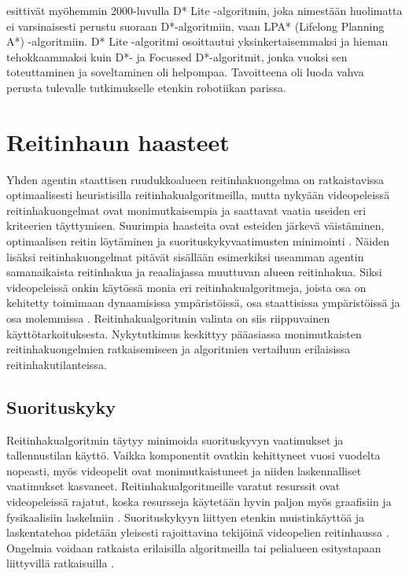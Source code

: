 \documentclass[utf8]{gradu3}
\begin{document}
\textcite{koenig2005fast} esittivät myöhemmin 2000-luvulla D* Lite -algoritmin, joka nimestään huolimatta ei varsinaisesti perustu suoraan D*-algoritmiin, vaan LPA* (Lifelong Planning A*) -algoritmiin. D* Lite -algoritmi osoittautui yksinkertaisemmaksi ja hieman tehokkaammaksi kuin D*- ja Focussed D*-algoritmit, jonka vuoksi sen toteuttaminen ja soveltaminen oli helpompaa. Tavoitteena oli luoda vahva perusta tulevalle tutkimukselle etenkin robotiikan parissa.

\section{Reitinhaun haasteet}

Yhden agentin staattisen ruudukkoalueen reitinhakuongelma on ratkaistavissa optimaalisesti heuristisilla reitinhakualgoritmeilla, mutta nykyään videopeleissä reitinhakuongelmat ovat monimutkaisempia ja saattavat vaatia useiden eri kriteerien täyttymisen. Suurimpia haasteita ovat esteiden järkevä väistäminen, optimaalisen reitin löytäminen ja suorituskykyvaatimusten minimointi \parencite{abd2015comprehensive,cui2011based}. Näiden lisäksi reitinhakuongelmat pitävät sisällään esimerkiksi useamman agentin samanaikaista reitinhakua ja reaaliajassa muuttuvan alueen reitinhakua. Siksi videopeleissä onkin käytössä monia eri reitinhakualgoritmeja, joista osa on kehitetty toimimaan dynaamisissa ympäristöissä, osa staattisissa ympäristöissä ja osa molemmissa \parencite{lawande2022systematic}. Reitinhakualgoritmin valinta on siis riippuvainen käyttötarkoituksesta. Nykytutkimus keskittyy pääasiassa monimutkaisten reitinhakuongelmien ratkaisemiseen ja algoritmien vertailuun erilaisissa reitinhakutilanteissa.

\subsection{Suorituskyky}

Reitinhakualgoritmin täytyy minimoida suorituskyvyn vaatimukset ja tallennustilan käyttö. Vaikka komponentit ovatkin kehittyneet vuosi vuodelta nopeasti, myös videopelit ovat monimutkaistuneet ja niiden laskennalliset vaatimukset kasvaneet. Reitinhakualgoritmeille varatut resurssit ovat videopeleissä rajatut, koska resursseja käytetään hyvin paljon myös graafisiin ja fysikaalisiin laskelmiin \parencite{lawande2022systematic}. Suorituskykyyn liittyen etenkin muistinkäyttöä ja laskentatehoa pidetään yleisesti rajoittavina tekijöinä videopelien reitinhaussa \parencite{botea2013pathfinding}. Ongelmia voidaan ratkaista erilaisilla algoritmeilla tai pelialueen esitystapaan liittyvillä ratkaisuilla \parencite{botea2013pathfinding,cui2011based}.
\end{document}
